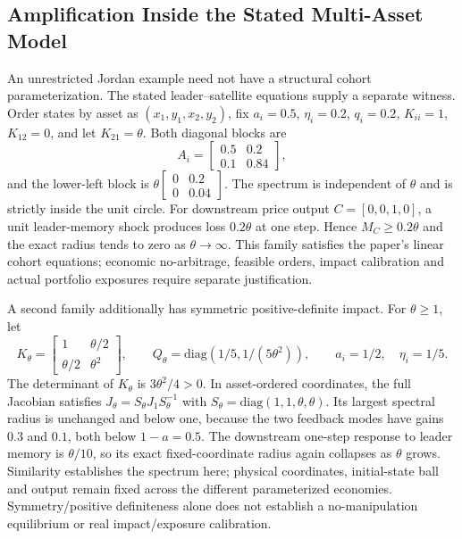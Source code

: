 \subsection{Amplification Inside the Stated Multi-Asset Model}
An unrestricted Jordan example need not have a structural cohort parameterization. The stated leader--satellite equations supply a separate witness. Order states by asset as $(x_1,y_1,x_2,y_2)$, fix $a_i=0.5$, $\eta_i=0.2$, $q_i=0.2$, $K_{ii}=1$, $K_{12}=0$, and let $K_{21}=\theta$. Both diagonal blocks are
\[
A_i=\begin{bmatrix}0.5&0.2\\0.1&0.84\end{bmatrix},
\]
and the lower-left block is $\theta\left[\begin{smallmatrix}0&0.2\\0&0.04\end{smallmatrix}\right]$. The spectrum is independent of $\theta$ and is strictly inside the unit circle. For downstream price output $C=[0,0,1,0]$, a unit leader-memory shock produces loss $0.2\theta$ at one step. Hence $M_C\ge0.2\theta$ and the exact radius tends to zero as $\theta\to\infty$. This family satisfies the paper's linear cohort equations; economic no-arbitrage, feasible orders, impact calibration and actual portfolio exposures require separate justification.

A second family additionally has symmetric positive-definite impact. For $\theta\ge1$, let
\[
K_\theta=\begin{bmatrix}1&\theta/2\\\theta/2&\theta^2\end{bmatrix},\qquad
Q_\theta=\mathrm{diag}(1/5,1/(5\theta^2)),\qquad a_i=1/2,\quad\eta_i=1/5.
\]
The determinant of $K_\theta$ is $3\theta^2/4>0$. In asset-ordered coordinates, the full Jacobian satisfies $J_\theta=S_\theta J_1S_\theta^{-1}$ with $S_\theta=\mathrm{diag}(1,1,\theta,\theta)$. Its largest spectral radius is unchanged and below one, because the two feedback modes have gains $0.3$ and $0.1$, both below $1-a=0.5$. The downstream one-step response to leader memory is $\theta/10$, so its exact fixed-coordinate radius again collapses as $\theta$ grows. Similarity establishes the spectrum here; physical coordinates, initial-state ball and output remain fixed across the different parameterized economies. Symmetry/positive definiteness alone does not establish a no-manipulation equilibrium or real impact/exposure calibration.

